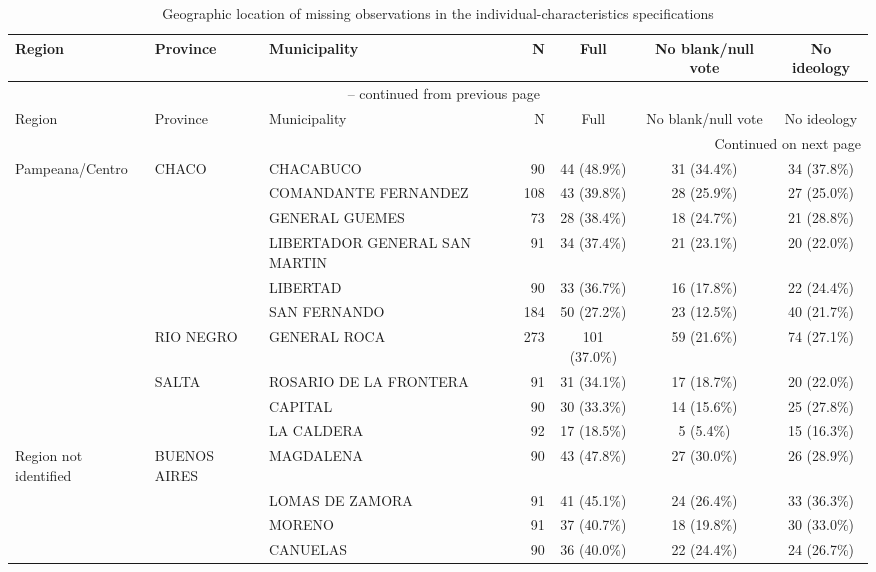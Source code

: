 \begin{landscape}
\begingroup
\small
\renewcommand{\arraystretch}{1.15}
\setlength{\tabcolsep}{4pt}
\begin{longtable}{p{2.2cm}p{3.0cm}p{4.0cm}rccc}
\caption{Geographic location of missing observations in the individual-characteristics specifications}\label{tab:a10_missing_places}\\
\toprule
Region & Province & Municipality & N & Full & No blank/null vote & No ideology \\
\midrule
\endfirsthead
\multicolumn{7}{c}{\tablename\ \thetable{} -- continued from previous page} \\
\toprule
Region & Province & Municipality & N & Full & No blank/null vote & No ideology \\
\midrule
\endhead
\midrule
\multicolumn{7}{r}{Continued on next page} \\
\endfoot
\bottomrule
\endlastfoot
Pampeana/Centro & CHACO & CHACABUCO & 90 & 44 (48.9\%) & 31 (34.4\%) & 34 (37.8\%) \\
 &  & COMANDANTE FERNANDEZ & 108 & 43 (39.8\%) & 28 (25.9\%) & 27 (25.0\%) \\
 &  & GENERAL GUEMES & 73 & 28 (38.4\%) & 18 (24.7\%) & 21 (28.8\%) \\
 &  & LIBERTADOR GENERAL SAN MARTIN & 91 & 34 (37.4\%) & 21 (23.1\%) & 20 (22.0\%) \\
 &  & LIBERTAD & 90 & 33 (36.7\%) & 16 (17.8\%) & 22 (24.4\%) \\
 &  & SAN FERNANDO & 184 & 50 (27.2\%) & 23 (12.5\%) & 40 (21.7\%) \\
\addlinespace[2pt]
 & RIO NEGRO & GENERAL ROCA & 273 & 101 (37.0\%) & 59 (21.6\%) & 74 (27.1\%) \\
\addlinespace[2pt]
 & SALTA & ROSARIO DE LA FRONTERA & 91 & 31 (34.1\%) & 17 (18.7\%) & 20 (22.0\%) \\
 &  & CAPITAL & 90 & 30 (33.3\%) & 14 (15.6\%) & 25 (27.8\%) \\
 &  & LA CALDERA & 92 & 17 (18.5\%) & 5 (5.4\%) & 15 (16.3\%) \\
\addlinespace[2pt]
Region not identified & BUENOS AIRES & MAGDALENA & 90 & 43 (47.8\%) & 27 (30.0\%) & 26 (28.9\%) \\
 &  & LOMAS DE ZAMORA & 91 & 41 (45.1\%) & 24 (26.4\%) & 33 (36.3\%) \\
 &  & MORENO & 91 & 37 (40.7\%) & 18 (19.8\%) & 30 (33.0\%) \\
 &  & CANUELAS & 90 & 36 (40.0\%) & 22 (24.4\%) & 24 (26.7\%) \\

\end{longtable}
\end{landscape}
